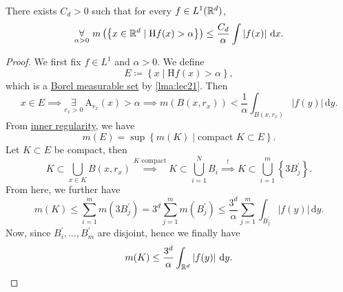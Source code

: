 \begin{theorem}\label{thm:HL-maximal-inequality}
	There exists \(C_{d} >0\) such that for every \(f\in L^1(\mathbb{\MakeUppercase{r}} ^d)\),
	\[
		\underset{\alpha >0}{\forall }\ m\left(\left\{x\in \mathbb{\MakeUppercase{r}} ^d\mid \mathrm{H}f(x) > \alpha  \right\}\right) \leq \frac{C_{d} }{\alpha }\int \left\vert f(x) \right\vert \,\mathrm{d} x.
	\]
\end{theorem}
\begin{proof}
	We first fix \(f\in L^1\) and \(\alpha >0\). We define
	\[
		E\coloneqq \left\{x\mid \mathrm{H}f (x) > \alpha \right\},
	\]
	which is a \hyperref[def:A-measurable-set]{Borel measurable set} by \autoref{lma:lec21}. Then
	\[
		x\in E\implies \underset{r_{x} >0}{\exists } \ \mathrm{A} _{r_{x} }(x)> \alpha \implies m(B(x, r_{x} ))< \frac{1}{\alpha }\int _{B(x, r_{x} )}\left\vert f(y) \right\vert \,\mathrm{d} y.
	\]
	From \hyperref[thm:inner-regularity]{inner regularity}, we have
	\[
		m(E) = \sup \left\{m(K)\mid \text{compact }K\subset E \right\}.
	\]
	Let \(K\subset E\) be compact, then
	\[
		K\subset \bigcup\limits_{x\in K}B(x, r_{x} ) \overset{K \text{ compact} }{\implies } K\subset \bigcup\limits_{i=1}^{N} B_{i} \overset{\hyperref[lma:Vitali-type-covering-lemma]{!}}{\implies} K\subset \bigcup\limits_{i=1}^{m} \left\{3 B_{j} ^\prime \right\}.
	\]
	From here, we further have
	\[
		m(K) \leq \sum\limits_{i=1}^{m} m(3 B_{j} ^\prime ) = 3^d \sum\limits_{j=1}^{m} m(B_{j} ^\prime ) \leq \frac{3^d}{\alpha }\sum\limits_{j=1}^{m} \int _{B_{j} ^\prime }\left\vert f(y) \right\vert \,\mathrm{d}y.
	\]
	Now, since \(B^\prime _{i} , \ldots , B^\prime _{m}  \) are disjoint, hence we finally have
	\[
		m(K) \leq \frac{3^d}{\alpha }\int _{\mathbb{\MakeUppercase{r}} ^d}\left\vert f(y) \right\vert \,\mathrm{d} y.
	\]
\end{proof}